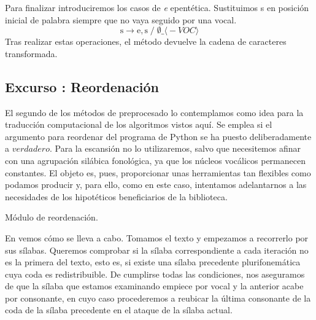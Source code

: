 Para finalizar introduciremos los casos de \textit{e} epentética. Sustituimos \textlangle{}s\textrangle{} en posición inicial de palabra siempre que no vaya seguido por una vocal.
\[\text{s} \longrightarrow \text{e}, \text{s}\;/\; \emptyset \_ {\scriptstyle\langle{}-VOC\rangle{}}\]
Tras realizar estas operaciones, el método devuelve la cadena de caracteres transformada.

\subsection{Excurso : Reordenación}
El segundo de los métodos de preprocesado lo contemplamos como idea para la traducción computacional de los algoritmos vistos aquí. Se emplea si el argumento para reordenar del programa de Python se ha puesto deliberadamente a $verdadero$. Para la escansión no lo utilizaremos, salvo que necesitemos afinar con una agrupación silábica fonológica, ya que los núcleos vocálicos permanecen constantes. El objeto es, pues, proporcionar unas herramientas tan flexibles como podamos producir y, para ello, como en este caso, intentamos adelantarnos a las necesidades de los hipotéticos beneficiarios de la biblioteca.

\begin{algorithm}[!ht] %
	\caption{Módulo de reordenación.}\label{list:reordena}
\end{algorithm}

En  vemos cómo se lleva a cabo. Tomamos el texto y empezamos a recorrerlo por sus sílabas. Queremos comprobar si la sílaba correspondiente a cada iteración no es la primera del texto, esto es, si existe una sílaba precedente plurifonemática cuya coda es redistribuible. De cumplirse todas las condiciones, nos aseguramos de que la sílaba que estamos examinando empiece por vocal y la anterior acabe por consonante, en cuyo caso procederemos a reubicar la última consonante de la coda de la sílaba precedente en el ataque de la sílaba actual. 

